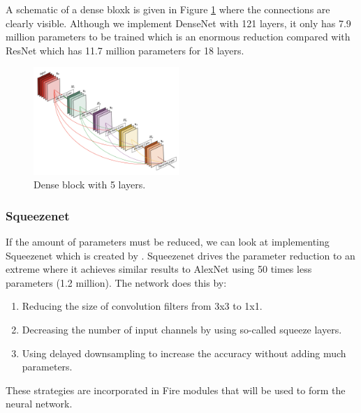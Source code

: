 		A schematic of a dense bloxk is given in Figure \ref{fig:lit:va:denseblock} where the connections are clearly visible. Although we implement DenseNet with 121 layers, it only has 7.9 million parameters to be trained which is an enormous reduction compared with ResNet which has 11.7 million parameters for 18 layers.
		
		\begin{figure}[hbtp]
		\centering
		\includegraphics[width=0.49\textwidth]{fig/Research/Vision_Algorithm/algorithms/Densenet/Dense_block.png}
		\caption{Dense block with 5 layers. \citep{Huang2017}}
		\label{fig:lit:va:denseblock}
		\end{figure}
		
		
		\subsubsection{Squeezenet}
		
		If the amount of parameters must be reduced, we can look at implementing Squeezenet which is created by \cite{Iandola2017}. Squeezenet drives the parameter reduction to an extreme where it achieves similar results to AlexNet using 50 times less parameters (1.2 million). The network does this by:
		\begin{enumerate}
		\item Reducing the size of convolution filters from 3x3 to 1x1.
		\item Decreasing the number of input channels by using so-called squeeze layers.
		\item Using delayed downsampling to increase the accuracy without adding much parameters.
		\end{enumerate}
		
		These strategies are incorporated in Fire modules that will be used to form the neural network. 
		
		

